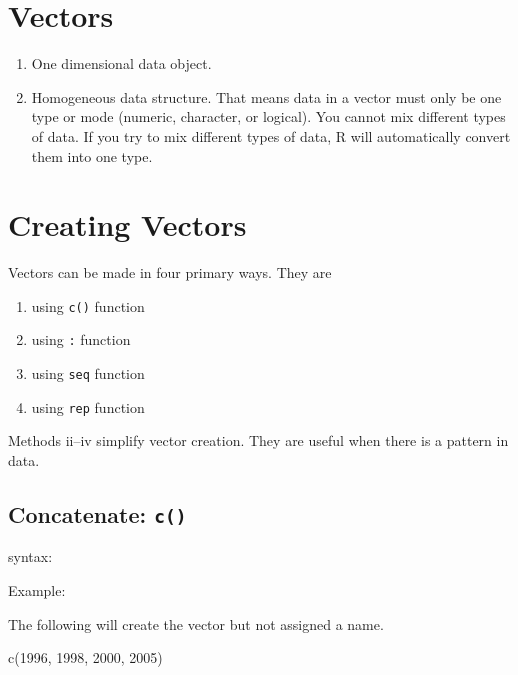 \documentclass[
  letterpaper,
  DIV=11,
  numbers=noendperiod]{scrreprt}
\newenvironment{Shaded}{\begin{snugshade}}{\end{snugshade}}
\newcommand{\DecValTok}[1]{\textcolor[rgb]{0.68,0.00,0.00}{#1}}
\newcommand{\FunctionTok}[1]{\textcolor[rgb]{0.28,0.35,0.67}{#1}}
\newcommand{\NormalTok}[1]{\textcolor[rgb]{0.00,0.23,0.31}{#1}}
\begin{document}
\hypertarget{vectors}{%
\section{Vectors}\label{vectors}}

\begin{enumerate}
\def\labelenumi{\arabic{enumi}.}
\item
  One dimensional data object.
\item
  Homogeneous data structure. That means data in a vector must only be
  one type or mode (numeric, character, or logical). You cannot mix
  different types of data. If you try to mix different types of data, R
  will automatically convert them into one type.
\end{enumerate}

\hypertarget{creating-vectors}{%
\section{Creating Vectors}\label{creating-vectors}}

Vectors can be made in four primary ways. They are

\begin{enumerate}
\def\labelenumi{\roman{enumi}.}
\item
  using \texttt{c()} function
\item
  using \texttt{:} function
\item
  using \texttt{seq} function
\item
  using \texttt{rep} function
\end{enumerate}

Methods ii--iv simplify vector creation. They are useful when there is a
pattern in data.

\hypertarget{concatenate-c}{%
\subsection{\texorpdfstring{Concatenate:
\texttt{c()}}{Concatenate: c()}}\label{concatenate-c}}

syntax:

Example:

The following will create the vector but not assigned a name.

\begin{Shaded}
\begin{Highlighting}[]
\FunctionTok{c}\NormalTok{(}\DecValTok{1996}\NormalTok{, }\DecValTok{1998}\NormalTok{, }\DecValTok{2000}\NormalTok{, }\DecValTok{2005}\NormalTok{)}
\end{Highlighting}
\end{Shaded}
\end{document}
